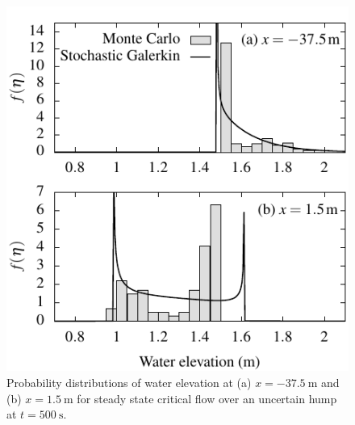 \begin{figure}
    \centering
    \includegraphics{fig-criticalSteadyState-pdf.pdf}
    \caption{Probability distributions of water elevation at (a) $x = \SI{-37.5}{\meter}$ and (b) $x = \SI{1.5}{\meter}$ for steady state critical flow over an uncertain hump at $t = \SI{500}{\second}$.}
    \label{fig:criticalSteadyState-pdf}
\end{figure}